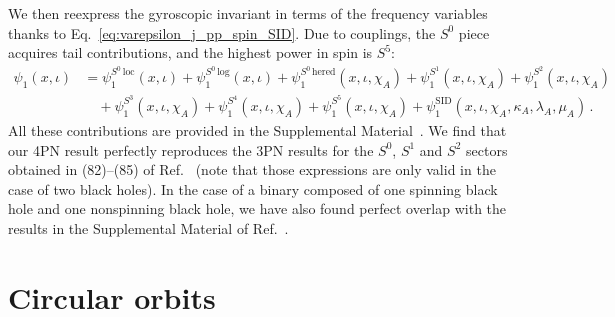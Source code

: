 \documentclass[prd,superscriptaddress,preprintnumbers,tightenlines,nofootinbib, eqsecnum]{revtex4-2}
\newcommand{\nn}{\nonumber}
\begin{document}
%
We then reexpress the gyroscopic invariant in terms of the frequency variables thanks to  Eq.~\eqref{eq:varepsilon_j_pp_spin_SID}. Due to couplings, the $S^0$ piece acquires tail contributions, and the highest power in spin is $S^5$:
\begin{align}
    \psi_1(x,\iota) &= \psi_1^{S^0\,\text{loc}}(x,\iota) + \psi_1^{S^0\,\text{log}}(x,\iota)  + \psi_1^{S^0\,\text{hered}}(x,\iota,\chi_A)+ \psi_1^{S^1}(x,\iota,\chi_A) +\psi_1^{S^2}(x,\iota,\chi_A) \nn\\
    & \quad + \psi_1^{S^3}(x,\iota,\chi_A) + \psi_1^{S^4}(x,\iota,\chi_A) + \psi_1^{S^5}(x,\iota,\chi_A)  + \psi_1^\text{SID}(x,\iota,\chi_A,\kappa_A,\lambda_A,\mu_A)\,.
\end{align}
All these contributions are provided in the Supplemental Material~\cite{Supplemental}. We find that our 4PN result perfectly reproduces the 3PN results for the $S^0$, $S^1$ and $S^2$ sectors obtained in (82)--(85) of Ref.~\cite{Bini:2019lkm} (note that those expressions are only valid in the case of two black holes).  In the case of a binary composed of one spinning black hole and one nonspinning black hole, we have also found perfect overlap with the results in the Supplemental Material of Ref.~\cite{Bautista:2024agp}.

 

\section{Circular orbits}
\label{sec:circular}
\end{document}

